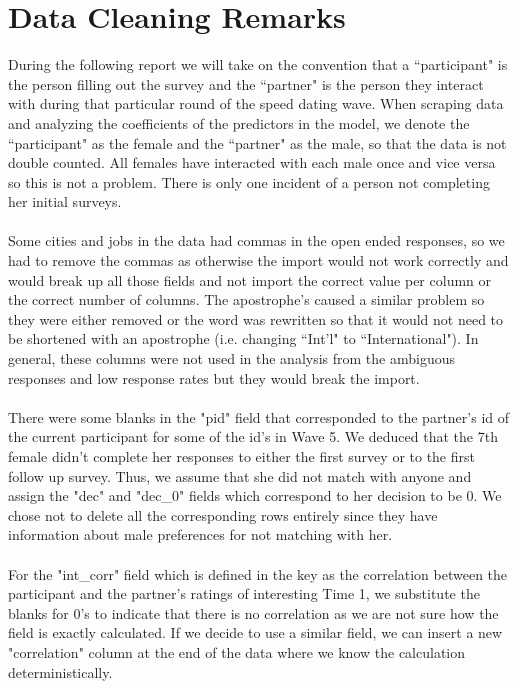 \documentclass{article}
\begin{document}
\section{Data Cleaning Remarks}
During the following report we will take on the convention that a ``participant" is the person filling out the survey and the ``partner" is the person they interact with during that particular round of the speed dating wave.  When scraping data and analyzing the coefficients of the predictors in the model, we denote the ``participant" as the female and the ``partner" as the male, so that the data is not double counted.  All females have interacted with each male once and vice versa so this is not a problem.  There is only one incident of a person not completing her initial surveys.\\
\null\\
Some cities and jobs in the data had commas in the open ended responses, so we had to remove the commas as otherwise the import would not work correctly and would break up all those fields and not import the correct value per column or the correct number of columns.  The apostrophe's caused a similar problem so they were either removed or the word was rewritten so that it would not need to be shortened with an apostrophe (i.e. changing ``Int'l" to ``International").  In general, these columns were not used in the analysis from the ambiguous responses and low response rates but they would break the import.\\
\null\\
There were some blanks in the "pid" field that corresponded to the partner's id of the current participant for some of the id's in Wave 5. We deduced that the 7th female  didn't complete her responses to either the first survey or to the first follow up survey. Thus, we assume that she did not match with anyone and assign the "dec" and "dec\_0" fields which correspond to her decision to be 0. We chose not to delete all the corresponding rows entirely since they have information about male preferences for not matching with her.\\
\null\\
For the "int\_corr" field which is defined in the key as the correlation between the participant and the partner's ratings of interesting Time 1, we substitute the blanks for 0's to indicate that there is no correlation as we are not sure how the field is exactly calculated. If we decide to use a similar field, we can insert a new "correlation" column at the end of the data where we know the calculation deterministically.\\
\end{document}
